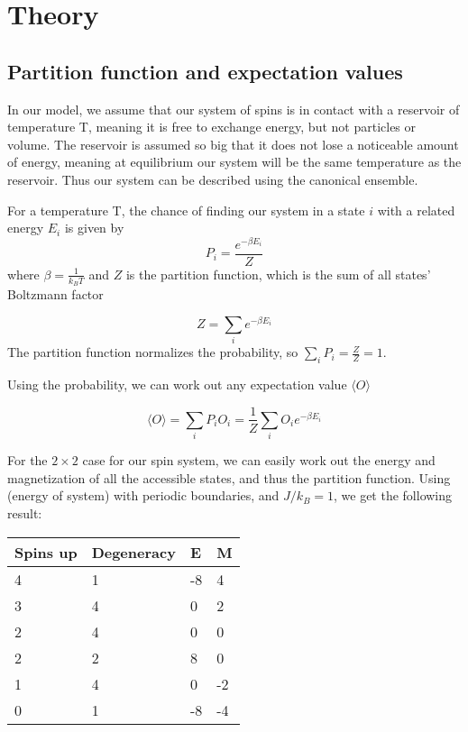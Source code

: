 \section{Theory}\label{sec:Theory}
\subsection{Partition function and expectation values}\label{PartAndExp}
In our model, we assume that our system of spins is in contact with a reservoir of temperature T, meaning it is free to exchange energy, but not particles or volume. The reservoir is assumed so big that it does not lose a noticeable amount of energy, meaning at equilibrium our system will be the same temperature as the reservoir. Thus our system can be described using the canonical ensemble. 

For a temperature T, the chance of finding our system in a state $i$ with a related energy $E_i$ is given by
\begin{equation}\label{eq:probability}
    P_i = \frac{e^{-\beta E_i}}{Z}
\end{equation}
where $\beta = \frac{1}{k_BT}$ and $Z$ is the partition function, which is the sum of all states' Boltzmann factor

\begin{equation}\label{eq:partition}
    Z = \sum_i e^{-\beta E_i}
\end{equation}
The partition function normalizes the probability, so $\sum_i P_i = \frac{Z}{Z} = 1$.

Using the probability, we can work out any expectation value $\langle O \rangle$

\begin{equation}\label{eq:expectation}
    \langle O \rangle = \sum_i P_i O_i = \frac{1}{Z}\sum_i O_i e^{-\beta E_i}
\end{equation}

For the $2\times2$ case for our spin system, we can easily work out the energy and magnetization of all the accessible states, and thus the partition function. Using (energy of system) with periodic boundaries, and $J/k_B=1$, we get the following result: 

\begin{table}[H]\label{tb:tabulated states}
\begin{tabular}{|l|l|l|l|}
\hline
 Spins up&  Degeneracy&  E&  M\\ \hline
 4&  1&  -8&  4\\ \hline
 3&  4&  0&  2\\ \hline
 2&  4&  0&  0\\ \hline
 2&  2&  8&  0\\ \hline
 1&  4&  0&  -2\\ \hline
 0&  1&  -8& -4\\ \hline
\end{tabular}
\end{table}

